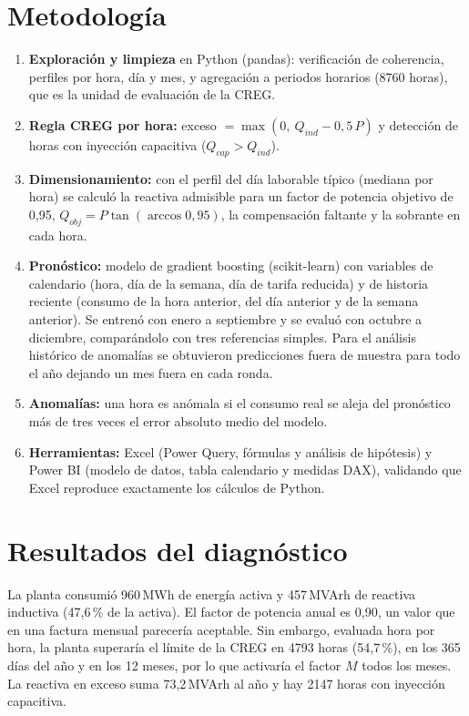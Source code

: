 \documentclass[11pt,a4paper]{article}
\begin{document}
\section{Metodología}
\begin{enumerate}
\item \textbf{Exploración y limpieza} en Python (pandas): verificación de coherencia, perfiles por hora, día y mes, y agregación a periodos horarios (8760 horas), que es la unidad de evaluación de la CREG.
\item \textbf{Regla CREG por hora:} exceso $=\max(0,\ Q_{ind}-0{,}5\,P)$ y detección de horas con inyección capacitiva ($Q_{cap}>Q_{ind}$).
\item \textbf{Dimensionamiento:} con el perfil del día laborable típico (mediana por hora) se calculó la reactiva admisible para un factor de potencia objetivo de 0,95, $Q_{obj}=P\tan(\arccos 0{,}95)$, la compensación faltante y la sobrante en cada hora.
\item \textbf{Pronóstico:} modelo de gradient boosting (scikit-learn) con variables de calendario (hora, día de la semana, día de tarifa reducida) y de historia reciente (consumo de la hora anterior, del día anterior y de la semana anterior). Se entrenó con enero a septiembre y se evaluó con octubre a diciembre, comparándolo con tres referencias simples. Para el análisis histórico de anomalías se obtuvieron predicciones fuera de muestra para todo el año dejando un mes fuera en cada ronda.
\item \textbf{Anomalías:} una hora es anómala si el consumo real se aleja del pronóstico más de tres veces el error absoluto medio del modelo.
\item \textbf{Herramientas:} Excel (Power Query, fórmulas y análisis de hipótesis) y Power BI (modelo de datos, tabla calendario y medidas DAX), validando que Excel reproduce exactamente los cálculos de Python.
\end{enumerate}

\section{Resultados del diagnóstico}
La planta consumió 960\,MWh de energía activa y 457\,MVArh de reactiva inductiva (47,6\,\% de la activa). El factor de potencia anual es 0,90, un valor que en una factura mensual parecería aceptable. Sin embargo, evaluada hora por hora, la planta superaría el límite de la CREG en 4793 horas (54,7\,\%), en los 365 días del año y en los 12 meses, por lo que activaría el factor $M$ todos los meses. La reactiva en exceso suma 73,2\,MVArh al año y hay 2147 horas con inyección capacitiva.
\end{document}
